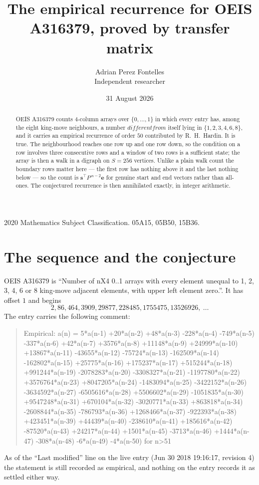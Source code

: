 \documentclass[11pt,a4paper]{article}
\title{The empirical recurrence for OEIS A316379, proved by transfer matrix}
\author{Adrian Perez Fontelles\\ \small Independent researcher}
\date{31 August 2026}
\theoremstyle{plain}
\theoremstyle{definition}
\begin{document}
\maketitle

\begin{abstract}
OEIS A316379 counts $4$-column arrays over $\{0,\dots,1\}$ in which every entry has,
among the eight king-move neighbours, a number $different from$ itself lying in $\{1,2,3,4,6,8\}$, and it carries an empirical
recurrence of order $50$ contributed by R.~H.~Hardin. It is true. The neighbourhood
reaches one row up and one row down, so the condition on a row involves three consecutive
rows and a window of two rows is a sufficient state; the array is then a walk in a digraph
on $S=256$ vertices. Unlike a plain walk count the boundary rows matter here --- the first
row has nothing above it and the last nothing below --- so the count is
$\mathbf{s}^{\!\top}P^{\,n-2}\mathbf{e}$ for genuine start and end vectors rather than
all-ones. The conjectured recurrence is then annihilated exactly, in integer arithmetic.
\end{abstract}

\noindent\small 2020 Mathematics Subject Classification. 05A15, 05B50, 15B36.\normalsize

\section{The sequence and the conjecture}

OEIS A316379 is ``Number of nX4 0..1 arrays with every element unequal to 1, 2, 3, 4, 6 or 8 king-move adjacent elements, with upper left element zero.''. It has offset
$1$ and begins
\[
2, 86, 464, 3909, 29877, 228485, 1755475, 13526926,\ \dots
\]
The entry carries the following comment:
\begin{quote}\small
Empirical: a(n) = 5*a(n-1) +20*a(n-2) +48*a(n-3) -228*a(n-4) -749*a(n-5) -337*a(n-6) +42*a(n-7) +3576*a(n-8) +11148*a(n-9) +24999*a(n-10) +13867*a(n-11) -43655*a(n-12) -75724*a(n-13) -162509*a(n-14) -162802*a(n-15) +25775*a(n-16) +175237*a(n-17) +515244*a(n-18) +991244*a(n-19) -2078283*a(n-20) -3308327*a(n-21) -1197780*a(n-22) +3576764*a(n-23) +8047205*a(n-24) -1483094*a(n-25) -3422152*a(n-26) -3634592*a(n-27) -6505616*a(n-28) +5506602*a(n-29) -1051835*a(n-30) +9547248*a(n-31) +670104*a(n-32) -3020771*a(n-33) +863818*a(n-34) -2608844*a(n-35) -786793*a(n-36) +1268466*a(n-37) -922393*a(n-38) +423451*a(n-39) +44439*a(n-40) -238610*a(n-41) +185616*a(n-42) -87520*a(n-43) +24217*a(n-44) +1501*a(n-45) -3713*a(n-46) +1444*a(n-47) -308*a(n-48) -6*a(n-49) -4*a(n-50) for n>51
\end{quote}
As of the ``Last modified'' line on the live entry (Jun 30 2018 19:16:17, revision
4) the statement is still recorded as empirical, and nothing on the entry
records it as settled either way.
\end{document}
